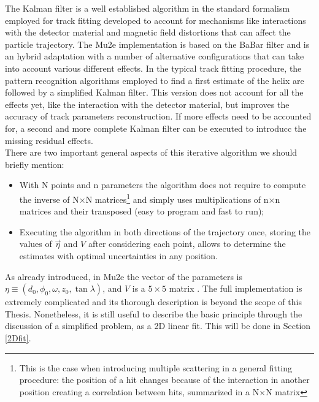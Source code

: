 \documentclass[12pt,a4paper,openright, oneside, titlepage]{book} %
\begin{document}
\noindent The Kalman filter is a well established algorithm in the standard formalism employed for track fitting developed to account for mechanisms like interactions with the detector material and magnetic field distortions that can affect the particle trajectory. 
The Mu2e implementation is based on the BaBar filter and is an hybrid adaptation \cite{Kalman} \cite{Kalman:1987} 
with a number of alternative configurations that can take into account various different effects. 
In the typical track fitting procedure, 
the pattern recognition algorithms employed to find a first estimate of the helix are followed by a simplified Kalman filter. 
This version does not account for all the effects yet, 
like the interaction with the detector material, 
but improves the accuracy of track parameters reconstruction. 
If more effects need to be accounted for, 
a second and more complete Kalman filter can be executed 
to introducc the missing residual effects. \\
There are two important general aspects of this iterative algorithm we should briefly mention: 
\begin{itemize}
\item With N points and n parameters the algorithm does not require to compute the inverse of N$\times$N matrices\footnote{This is the case when introducing multiple scattering in a general fitting procedure: the position of a hit changes because of the interaction in another position creating a correlation between hits, summarized in a N$\times$N matrix} and simply uses multiplications of n$\times$n matrices and their transposed (easy to program and fast to run);
\item Executing the algorithm in both directions of the trajectory once, storing the values of $\vec{\eta}$ and $V$ after considering each point, allows to determine the estimates with optimal uncertainties in any position.
\end{itemize} 
As already introduced, in Mu2e the vector of the parameters is $\eta \equiv ( d_0, \phi_0, \omega, z_0, \tan \lambda)$, and $V$ is a $5\times5$ matrix \cite{Kalman}.  
The full implementation is extremely complicated and its thorough description is beyond the scope
of this Thesis. 
Nonetheless, it is still useful to describe the basic principle through the discussion of a simplified problem, as a 2D linear fit. 
This will be done in Section \ref{2Dfit}.\\
\end{document}

